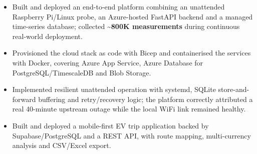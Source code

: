 \begin{itemize}
  \item Built and deployed an end-to-end platform combining an unattended Raspberry Pi/Linux probe, an Azure-hosted FastAPI backend and a managed time-series database; collected \textbf{\textasciitilde 800K measurements} during continuous real-world deployment.
  \item Provisioned the cloud stack as code with Bicep and containerised the services with Docker, covering Azure App Service, Azure Database for PostgreSQL/TimescaleDB and Blob Storage.
  \item Implemented resilient unattended operation with systemd, SQLite store-and-forward buffering and retry/recovery logic; the platform correctly attributed a real 40-minute upstream outage while the local WiFi link remained healthy.
\end{itemize}
\vspace{2pt}
\begin{itemize}
  \item Built and deployed a mobile-first EV trip application backed by Supabase/PostgreSQL and a REST API, with route mapping, multi-currency analysis and CSV/Excel export.
\end{itemize}
